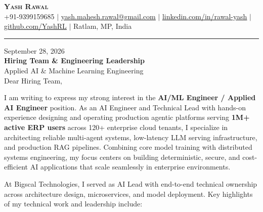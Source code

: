 \documentclass[letterpaper,11pt]{article}
\begin{document}
\begin{center}
    \textbf{\Huge \scshape Yash Rawal} \\ \vspace{1pt}
    \small +91-9399159685 $|$ \href{mailto:yash.mahesh.rawal@gmail.com}{\uline{yash.mahesh.rawal@gmail.com}} $|$ 
    \href{https://linkedin.com/in/rawal-yash}{\uline{linkedin.com/in/rawal-yash}} $|$
    \href{https://github.com/YashRL}{\uline{github.com/YashRL}} $|$
    Ratlam, MP, India
\end{center}

\vspace{-4pt}
\hrule
\vspace{10pt}

\noindent September 28, 2026 \\
\textbf{Hiring Team \& Engineering Leadership} \\
Applied AI \& Machine Learning Engineering \\

\vspace{8pt}
\noindent Dear Hiring Team,

\vspace{6pt}
I am writing to express my strong interest in the \textbf{AI/ML Engineer / Applied AI Engineer} position. As an AI Engineer and Technical Lead with hands-on experience designing and operating production agentic platforms serving \textbf{1M+ active ERP users} across 120+ enterprise cloud tenants, I specialize in architecting reliable multi-agent systems, low-latency LLM serving infrastructure, and production RAG pipelines. Combining core model training with distributed systems engineering, my focus centers on building deterministic, secure, and cost-efficient AI applications that scale seamlessly in enterprise environments.

\vspace{6pt}
At Bigscal Technologies, I served as AI Lead with end-to-end technical ownership across architecture design, microservices, and model deployment. Key highlights of my technical work and leadership include:
\end{document}
